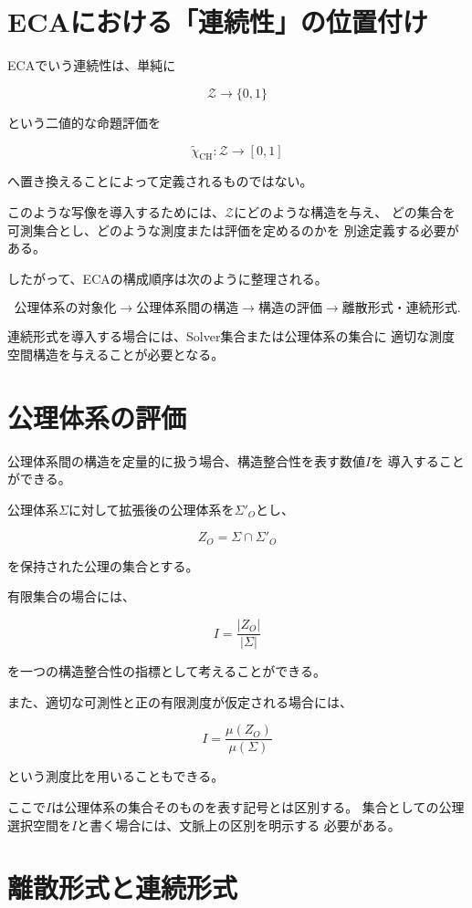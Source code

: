 \documentclass[12pt,a4paper]{article}
\begin{document}
\section{ECAにおける「連続性」の位置付け}

ECAでいう連続性は、単純に

\[
\mathcal{Z}\to\{0,1\}
\]

という二値的な命題評価を

\[
\widetilde{\chi}_{\mathrm{CH}}:
\mathcal{Z}\to[0,1]
\]

へ置き換えることによって定義されるものではない。

このような写像を導入するためには、$\mathcal{Z}$にどのような構造を与え、
どの集合を可測集合とし、どのような測度または評価を定めるのかを
別途定義する必要がある。

したがって、ECAの構成順序は次のように整理される。

\[
\text{公理体系の対象化}
\longrightarrow
\text{公理体系間の構造}
\longrightarrow
\text{構造の評価}
\longrightarrow
\text{離散形式・連続形式}.
\]

連続形式を導入する場合には、Solver集合または公理体系の集合に
適切な測度空間構造を与えることが必要となる。

\section{公理体系の評価}

公理体系間の構造を定量的に扱う場合、構造整合性を表す数値$I$を
導入することができる。

公理体系$\Sigma$に対して拡張後の公理体系を$\Sigma'_O$とし、

\[
Z_O=\Sigma\cap\Sigma'_O
\]

を保持された公理の集合とする。

有限集合の場合には、

\[
I=
\frac{|Z_O|}{|\Sigma|}
\]

を一つの構造整合性の指標として考えることができる。

また、適切な可測性と正の有限測度が仮定される場合には、

\[
I=
\frac{\mu(Z_O)}{\mu(\Sigma)}
\]

という測度比を用いることもできる。

ここで$I$は公理体系の集合そのものを表す記号とは区別する。
集合としての公理選択空間を$I$と書く場合には、文脈上の区別を明示する
必要がある。

\section{離散形式と連続形式}
\end{document}
